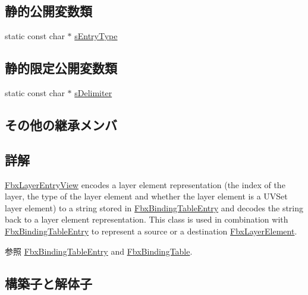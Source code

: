 \subsection*{静的公開変数類}
\begin{DoxyCompactItemize}
\item 
static const char $\ast$ \hyperlink{class_fbx_layer_entry_view_aa8222d7ad3155f8e83652e030ab22e91}{s\+Entry\+Type}
\end{DoxyCompactItemize}
\subsection*{静的限定公開変数類}
\begin{DoxyCompactItemize}
\item 
static const char $\ast$ \hyperlink{class_fbx_layer_entry_view_a2143b40ee433ec7138342298b0cf76f3}{s\+Delimiter}
\end{DoxyCompactItemize}
\subsection*{その他の継承メンバ}


\subsection{詳解}
\hyperlink{class_fbx_layer_entry_view}{Fbx\+Layer\+Entry\+View} encodes a layer element representation (the index of the layer, the type of the layer element and whether the layer element is a U\+V\+Set layer element) to a string stored in \hyperlink{class_fbx_binding_table_entry}{Fbx\+Binding\+Table\+Entry} and decodes the string back to a layer element representation. This class is used in combination with \hyperlink{class_fbx_binding_table_entry}{Fbx\+Binding\+Table\+Entry} to represent a source or a destination \hyperlink{class_fbx_layer_element}{Fbx\+Layer\+Element}. \begin{DoxySeeAlso}{参照}
\hyperlink{class_fbx_binding_table_entry}{Fbx\+Binding\+Table\+Entry} and \hyperlink{class_fbx_binding_table}{Fbx\+Binding\+Table}. 
\end{DoxySeeAlso}


\subsection{構築子と解体子}
\mbox{\label{class_fbx_layer_entry_view_a7c5fc0472d0b3d60d0207acc80751daf}} 
